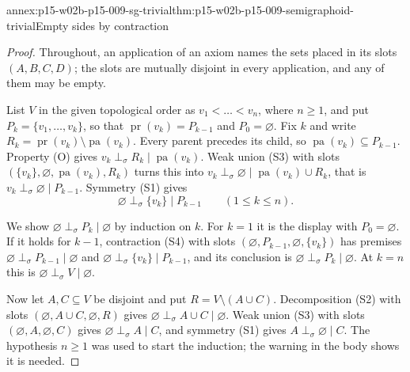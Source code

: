 \begin{annexitem}{annex:p15-w02b-p15-009-sg-trivial}{thm:p15-w02b-p15-009-semigraphoid-trivial}{Empty sides by contraction}
\begin{proof}
Throughout, an application of an axiom names the sets placed in its
slots \((A,B,C,D)\); the slots are mutually disjoint in every
application, and any of them may be empty.

List \(V\) in the given topological order as \(v_1<\dots<v_n\), where
\(n\geq1\), and put \(P_k=\{v_1,\ldots,v_k\}\), so that
\(\operatorname{pr}(v_k)=P_{k-1}\) and \(P_0=\varnothing\). Fix \(k\)
and write \(R_k=\operatorname{pr}(v_k)\setminus\operatorname{pa}(v_k)\).
Every parent precedes its child, so
\(\operatorname{pa}(v_k)\subseteq P_{k-1}\). Property (O) gives
\(v_k\perp_\sigma R_k\mid\operatorname{pa}(v_k)\). Weak union (S3)
with slots \((\{v_k\},\varnothing,\operatorname{pa}(v_k),R_k)\) turns
this into \(v_k\perp_\sigma\varnothing\mid\operatorname{pa}(v_k)\cup R_k\),
that is \(v_k\perp_\sigma\varnothing\mid P_{k-1}\). Symmetry (S1)
gives
\[
 \varnothing\perp_\sigma\{v_k\}\mid P_{k-1}\qquad(1\leq k\leq n).
\]

We show \(\varnothing\perp_\sigma P_k\mid\varnothing\) by induction on
\(k\). For \(k=1\) it is the display with \(P_0=\varnothing\). If it
holds for \(k-1\), contraction (S4) with slots
\((\varnothing,P_{k-1},\varnothing,\{v_k\})\) has premises
\(\varnothing\perp_\sigma P_{k-1}\mid\varnothing\) and
\(\varnothing\perp_\sigma\{v_k\}\mid P_{k-1}\), and its conclusion is
\(\varnothing\perp_\sigma P_k\mid\varnothing\). At \(k=n\) this is
\(\varnothing\perp_\sigma V\mid\varnothing\).

Now let \(A,C\subseteq V\) be disjoint and put
\(R=V\setminus(A\cup C)\). Decomposition (S2) with slots
\((\varnothing,A\cup C,\varnothing,R)\) gives
\(\varnothing\perp_\sigma A\cup C\mid\varnothing\). Weak union (S3)
with slots \((\varnothing,A,\varnothing,C)\) gives
\(\varnothing\perp_\sigma A\mid C\), and symmetry (S1) gives
\(A\perp_\sigma\varnothing\mid C\). The hypothesis \(n\geq1\) was used
to start the induction; the warning in the body shows it is needed.
\end{proof}
\end{annexitem}

